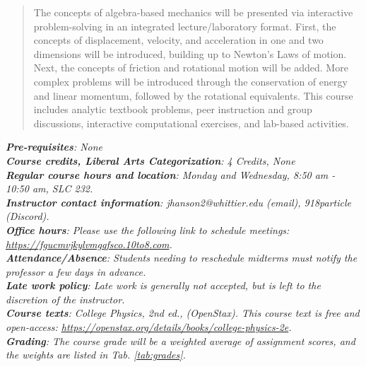 \documentclass[10pt]{article}
\begin{document}
\maketitle

\begin{abstract}
The concepts of algebra-based mechanics will be presented via interactive problem-solving in an integrated lecture/laboratory format.  First, the concepts of displacement, velocity, and acceleration in one and two dimensions will be introduced, building up to Newton's Laws of motion.  Next, the concepts of friction and rotational motion will be added.  More complex problems will be introduced through the conservation of energy and linear momentum, followed by the rotational equivalents.  This course includes analytic textbook problems, peer instruction and group discussions, interactive computational exercises, and lab-based activities.
\end{abstract}
\noindent
\textit{\textbf{Pre-requisites}: None} \\
\textit{\textbf{Course credits, Liberal Arts Categorization}: 4 Credits, None} \\
\textit{\textbf{Regular course hours and location}: Monday and Wednesday, 8:50 am - 10:50 am, SLC 232.} \\
\textit{\textbf{Instructor contact information}: jhanson2@whittier.edu (email), 918particle (Discord).} \\
\textit{\textbf{Office hours}: Please use the following link to schedule meetings: \url{https://fgucmvjkylvmgqfsco.10to8.com}.} \\
\textit{\textbf{Attendance/Absence}: Students needing to reschedule midterms must notify the professor a few days in advance.} \\ 
\textit{\textbf{Late work policy}: Late work is generally not accepted, but is left to the discretion of the instructor.} \\
\textit{\textbf{Course texts}: College Physics, 2nd ed., (OpenStax).  This course text is free and open-access: \url{https://openstax.org/details/books/college-physics-2e}.} \\
\textit{\textbf{Grading}: The course grade will be a weighted average of assignment scores, and the weights are listed in Tab. \ref{tab:grades}.}
\end{document}
